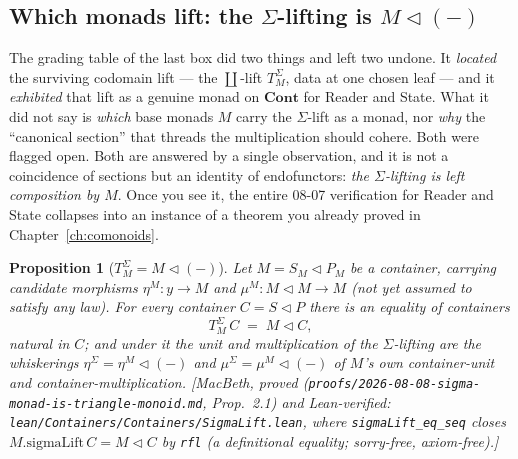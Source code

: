 \documentclass[11pt,a4paper]{book}
\newcommand{\Cont}{\mathbf{Cont}}
\newcommand{\y}{y}
\newcommand{\cont}[2]{#1 \triangleleft #2}
\theoremstyle{plain}
\newtheorem{Proposition}[Theorem]{Proposition}
\theoremstyle{definition}
\theoremstyle{remark}
\newcommand{\prov}[1]{\hfill\textsf{\footnotesize[#1]}}
\begin{document}
\subsection{Which monads lift: the \texorpdfstring{$\Sigma$}{Sigma}-lifting is \texorpdfstring{$M\triangleleft(-)$}{M comp -}}
\label{sec:sigma-is-comp}

The grading table of the last box did two things and left two undone. It \emph{located} the
surviving codomain lift --- the $\coprod$-lift $T^{\Sigma}_{M}$, data at one chosen leaf --- and it
\emph{exhibited} that lift as a genuine monad on $\Cont$ for Reader and State. What it
did not say is \emph{which} base monads $M$ carry the $\Sigma$-lift as a monad, nor \emph{why} the
``canonical section'' that threads the multiplication should cohere. Both were flagged open. Both are
answered by a single observation, and it is not a coincidence of sections but an identity of
endofunctors: \emph{the $\Sigma$-lifting is left composition by $M$}. Once you see it, the entire
08-07 verification for Reader and State collapses into an instance of a theorem you already proved in
Chapter~\ref{ch:comonoids}.

\begin{Proposition}[$T^{\Sigma}_{M}=M\triangleleft(-)$]\label{prop:sigma-is-comp}
Let $M=\cont{S_{M}}{P_{M}}$ be a container, carrying candidate morphisms $\eta^{M}\colon\y\to M$ and
$\mu^{M}\colon M\triangleleft M\to M$ (not yet assumed to satisfy any law). For every container
$C=\cont S P$ there is an equality of containers
\[
  T^{\Sigma}_{M}\,C\;=\;M\triangleleft C,
\]
natural in $C$; and under it the unit and multiplication of the $\Sigma$-lifting are the whiskerings
$\eta^{\Sigma}=\eta^{M}\triangleleft(-)$ and $\mu^{\Sigma}=\mu^{M}\triangleleft(-)$ of $M$'s own
container-unit and container-multiplication.
\prov{MacBeth, proved (\texttt{proofs/2026-08-08-sigma-monad-is-triangle-monoid.md}, Prop.~2.1) and
Lean-verified: \texttt{lean/Containers/Containers/SigmaLift.lean}, where
\texttt{sigmaLift\_eq\_seq} closes $M.\mathrm{sigmaLift}\,C=M\triangleleft C$ by \texttt{rfl}
(a \emph{definitional} equality; sorry-free, axiom-free).}
\end{Proposition}
\end{document}
